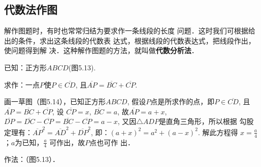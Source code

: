 \subsection{代数法作图}
解作图题时，有时也常常归结为要求作一条线段的长度
问题．这时我们可根据给出的条件，求出这条线段的代数表
达式，根据线段的代数表达式，把线段作出，使问题得到解
决．这种解作图题的方法，就叫做\textbf{代数分析法}．

\begin{example}
    已知：正方形$ABCD$(图5.13).

    求作：一点$P$使$P\in \overline{CD}$, 且$\overline{AP}=\overline{BC}+\overline{CP}$.
\end{example}

\begin{figure}[htp]\centering
    \begin{minipage}[t]{0.48\textwidth}
    \centering
{}
    \caption{}
    \end{minipage}
    \begin{minipage}[t]{0.48\textwidth}
    \centering
    \caption{}
    \end{minipage}
    \end{figure}

\begin{analyze}
    画一草图（图5.14），已知正方形$ABCD$, 假设$P$点是所求作的点，即$P\in \overline{CD}$, 且$\overline{AP}=\overline{BC}+
    \overline{CP}$, 设
    $\overline{CP}=x$, $\overline{BC}=a$, 故$\overline{AP}=a+x$, $\overline{DP}=\overline{DC}-\overline{CP}=\overline{BC}-\overline{CP}=a-x$, 又因$\triangle ADP$是直角三角形，所以根据
    勾股定理有：$\overline{AP}^2=\overline{AD}^2+\overline{DP}^2$, 即：$(a+x)^2=a^2+(a-x)^2$.
    解此方程得
    $x=\frac{a}{4}$；$a$为已知，$\frac{a}{4}$
    可作出，故$P$点也可作
    出．
\end{analyze}

作法：（图5.13）．


